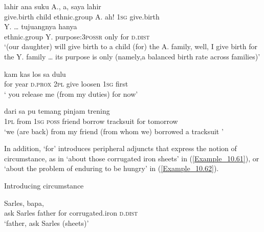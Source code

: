 \ea
\label{Example_10.58}
\gll {\ldots} {{lahir}} {{ana}} {{suku}} {{A.,}} {a,} {{saya}} {{lahir}}\\ %
 {}  {give.birth}  {child}  {ethnic.group}  {A}.  ah!  {\textsc{1sg}}  {give.birth}\\
  {Y}.  {\ldots}  {tujuangnya}  {hanya}  {}  \\
 {ethnic.group}  {Y}.  {}  {purpose:\textsc{3possr}}  {only}  {for}  \textsc{d.dist}\\
 ‘(our daughter) will give birth to a child (for) the A. family, well, I give birth for the Y. family {\ldots} its purpose is only  (namely,\bluebold{ }a balanced birth rate across families)’ \textstyleExampleSource{[081006-024-CvEx.0079]}
\z

\ea
\label{Example_10.59}
 {} {} {kam} {kas} {los} {sa} {dulu}\\ %
 for  year  \textsc{d.prox}  \textsc{2pl}  give  loosen  \textsc{1sg}  first\\
\glt 
‘ you release me (from my duties) for now’ \textstyleExampleSource{[080922-002-Cv.0084]}
\z

\ea
\label{Example_10.60}
 {dari} {sa} {pu} {temang} {pinjam} {trening} {} {}\\ %
 \textsc{1pl}  from  \textsc{1sg}  \textsc{poss}  friend  borrow  tracksuit  for  tomorrow\\
\glt 
‘we (are back) from my friend (from whom we) borrowed a tracksuit ’ \textstyleExampleSource{[081011-020-Cv.0052]}
\z


In addition,  ‘for’ introduces peripheral adjuncts that express the notion of circumstance, as in  ‘about those corrugated iron sheets’ in (\ref{Example_10.61}), or  ‘about the problem of enduring to be hungry’ in (\ref{Example_10.62}).


\begin{styleExampleTitle}
Introducing circumstance
\end{styleExampleTitle}

\ea
\label{Example_10.61}
 {Sarles,} {bapa,} {} {} {}\\ %
 ask  Sarles  father  for  corrugated.iron  \textsc{d.dist}\\
\glt 
‘father, ask Sarles  (sheets)’ \textstyleExampleSource{[080925-003-Cv.0003]}
\z


